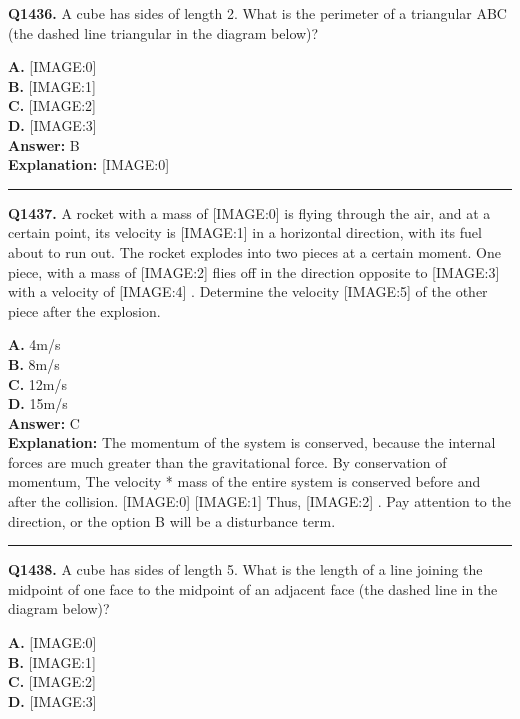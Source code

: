 \documentclass[12pt]{article}
\begin{document}
\noindent
\textbf{Q1436.} A cube has sides of length 2. What is the perimeter of a triangular ABC (the dashed line triangular in the diagram below)?



\textbf{A.} [IMAGE:0] \\
\textbf{B.} [IMAGE:1] \\
\textbf{C.} [IMAGE:2] \\
\textbf{D.} [IMAGE:3] \\

\textbf{Answer:} B \\
\textbf{Explanation:} [IMAGE:0]

\hrule
\vspace{1em}


\noindent
\textbf{Q1437.} A rocket with a mass of
[IMAGE:0]
is flying through the air, and at a certain point, its velocity is
[IMAGE:1]
in a horizontal direction, with its fuel about to run out. The rocket explodes into two pieces at a certain moment. One piece, with a mass of
[IMAGE:2]
flies off in the direction opposite to
[IMAGE:3]
with a velocity of
[IMAGE:4]
. Determine the velocity
[IMAGE:5]
of the other piece after the explosion.



\textbf{A.} 4m/s \\
\textbf{B.} 8m/s \\
\textbf{C.} 12m/s \\
\textbf{D.} 15m/s \\

\textbf{Answer:} C \\
\textbf{Explanation:} The momentum of the system is conserved, because the internal forces are much greater than the gravitational force.
By conservation of momentum, The velocity * mass of the entire system is conserved before and after the collision.
[IMAGE:0]
[IMAGE:1]
Thus,
[IMAGE:2]
. Pay attention to the direction, or the option B will be a disturbance term.

\hrule
\vspace{1em}


\noindent
\textbf{Q1438.} A cube has sides of length 5. What is the length of a line joining the midpoint of one face to the midpoint of an adjacent face (the dashed line in the diagram below)?



\textbf{A.} [IMAGE:0] \\
\textbf{B.} [IMAGE:1] \\
\textbf{C.} [IMAGE:2] \\
\textbf{D.} [IMAGE:3] \\
\end{document}
